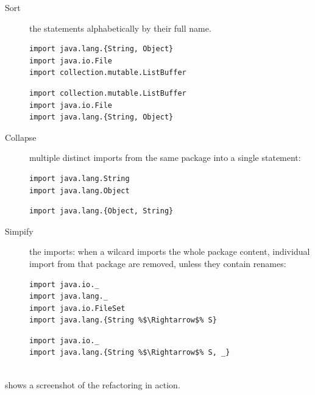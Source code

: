 \documentclass[10pt,a4paper,oneside]{scrreprt}
\begin{document}
\begin{description}
  \item[Sort] the statements alphabetically by their full name.
\begin{multicols}{2}
\begin{lstlisting}
import java.lang.{String, Object}
import java.io.File
import collection.mutable.ListBuffer
\end{lstlisting}
\begin{lstlisting}
import collection.mutable.ListBuffer
import java.io.File
import java.lang.{String, Object}
\end{lstlisting}
\end{multicols}

  \item[Collapse] multiple distinct imports from the same package into a single statement:
\begin{multicols}{2}
\begin{lstlisting}
import java.lang.String
import java.lang.Object
\end{lstlisting}
\begin{lstlisting}
import java.lang.{Object, String}

\end{lstlisting}
\end{multicols}

  \item[Simpify] the imports: when a wilcard imports the whole package content, individual import from that package are removed, unless they contain renames:
\begin{multicols}{2}
\begin{lstlisting}
import java.io._
import java.lang._
import java.io.FileSet
import java.lang.{String %$\Rightarrow$% S}
\end{lstlisting}
\needspace{\baselineskip}
\begin{lstlisting}
import java.io._
import java.lang.{String %$\Rightarrow$% S, _}


\end{lstlisting}
\end{multicols}
\end{description}

 shows a screenshot of the refactoring in action.
\end{document}
